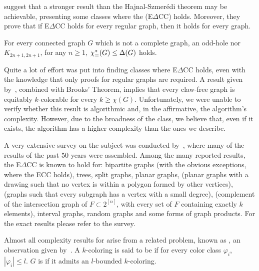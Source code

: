 \citep{e_delta_cc} suggest that a stronger result than the Hajnal-Szmerédi theorem may be achievable, presenting some classes where the  (E$\Delta$CC) holds.
Moreover, they prove that if E$\Delta$CC holds for every regular graph, then it holds for every graph.

\begin{conjecture*}[E$\Delta$CC]
    For every connected graph $G$ which is not a complete graph, an odd-hole nor $K_{2n+1, 2n+1}$, for any $n \geq 1$, $\chi_{\mathcal{=}}^*(G) \leq \Delta(G)$ holds.
\end{conjecture*}

Quite a lot of effort was put into finding classes where E$\Delta$CC holds, even with the knowledge that only proofs for regular graphs are required.
A result given by~\citep{claw_free_de_werra}, combined with Brooks' Theorem, implies that every claw-free graph is equitably $k$-colorable for every $k \geq \chi(G)$.
Unfortunately, we were unable to verify whether this result is algorithmic and, in the affirmative, the algorithm's complexity.
However, due to the broadness of the class, we believe that, even if it exists, the algorithm has a higher complexity than the ones we describe.

A very extensive survey on the subject was conducted by~\citep{equitable_survey}, where many of the results of the past 50 years were assembled.
Among the many reported results, the E$\Delta$CC is known to hold for:
bipartite graphs (with the obvious exceptions, where the ECC holds),
trees,
split graphs,
planar graphs,
 (planar graphs with a drawing such that no vertex is within a polygon formed by other vertices),
 (graphs such that every subgraph has a vertex with a small degree),
 (complement of the intersection graph of $F \subset 2^{[n]}$, with every set of $F$ containing exactly $k$ elements),
interval graphs,
random graphs and
some forms of graph products.
For the exact results please refer to the survey.

Almost all complexity results for  arise from a related problem, known as , an observation given by~\citep{equitable_treewidth}.
A $k$-coloring is said to be  if for every color class $\varphi_i$, $|\varphi_i| \leq l$.
$G$ is  if it admits an $l$-bounded $k$-coloring.


